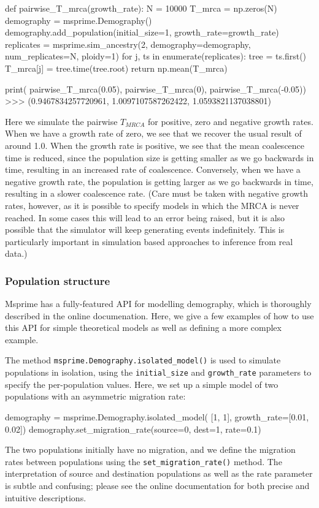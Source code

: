 \documentclass[graybox]{svmult}
\begin{document}
\begin{pythoncode}
def pairwise_T_mrca(growth_rate):
    N = 10000
    T_mrca = np.zeros(N)
    demography = msprime.Demography()
    demography.add_population(initial_size=1, growth_rate=growth_rate)
    replicates = msprime.sim_ancestry(2, demography=demography,
        num_replicates=N, ploidy=1)
    for j, ts in enumerate(replicates):
        tree = ts.first()
        T_mrca[j] = tree.time(tree.root)
    return np.mean(T_mrca)

print(
    pairwise_T_mrca(0.05), pairwise_T_mrca(0),
    pairwise_T_mrca(-0.05))
>>> (0.9467834257720961, 1.0097107587262422, 1.0593821137038801)
\end{pythoncode}

Here we simulate the pairwise \(T_{MRCA}\) for positive, zero and
negative growth rates. When we have a growth rate of zero, we see that we
recover the usual result of around 1.0. When the growth rate is positive, we see that the
mean coalescence time is reduced, since the population size is getting
smaller as we go backwards in time, resulting in an increased rate of
coalescence. Conversely, when we have a negative growth rate, the
population is getting larger as we go backwards in time, resulting in a
slower coalescence rate. (Care must be taken with negative growth rates,
however, as it is possible to specify models in which the MRCA is never
reached. In some cases this will lead to an error being raised, but it
is also possible that the simulator will keep generating events
indefinitely. This is particularly important in simulation based
approaches to inference from real data.)

\subsubsection{Population structure}\label{population-structure}
Msprime has a fully-featured API for modelling demography, which
is thoroughly described in the online documenation. Here, we give a few examples
of how to use this API for simple theoretical models as well as
defining a more complex example.

\label{isolated-model}
The method \texttt{msprime.Demography.isolated\_model()} is used to
simulate populations in isolation,
using the  \texttt{initial\_size} and
\texttt{growth\_rate} parameters to specify the per-population
values.
Here, we set up a simple model of two populations with an asymmetric
migration rate:
\begin{pythoncode}
    demography = msprime.Demography.isolated_model(
        [1, 1], growth_rate=[0.01, 0.02])
    demography.set_migration_rate(source=0, dest=1, rate=0.1)
\end{pythoncode}
The two populations initially have no migration, and we
define the migration rates between populations using the \texttt{set\_migration\_rate()}
method. The interpretation of source and destination populations
as well as the rate parameter is subtle and confusing; please see
the online documentation for both precise and intuitive descriptions.
\end{document}
